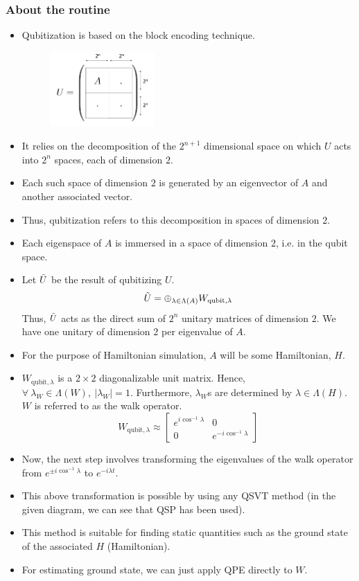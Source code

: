 \documentclass[
10pt, %
a4paper, %
oneside, %
headinclude,footinclude, %
BCOR5mm, %
]{scrartcl}
\begin{document}
\subsubsection{About the routine}
\begin{itemize}
    \item Qubitization is based on the block encoding technique.
    \begin{figure}[H]
        \centering
        \includegraphics[width=40mm]{images/encoding.png}
    \end{figure}
    \item It relies on the decomposition of the $2^{n + 1}$ dimensional space on which $U$ acts into $2^n$ spaces, each of dimension $2$.
    \item Each such space of dimension $2$ is generated by an eigenvector of $A$ and another associated vector.
    \item Thus, qubitization refers to this decomposition in spaces of dimension $2$.
    \item Each eigenspace of $A$ is immersed in a space of dimension $2$, i.e. in the qubit space.
    \item Let $\Tilde{U}$ be the result of qubitizing $U$.
    $$\Tilde{U} = \oplus_{\lambda \in \Lambda(A)} W_{\text{qubit}, \lambda}$$
    Thus, $\Tilde{U}$ acts as the direct sum of ${2^n}$ unitary matrices of dimension $2$. We have one unitary of dimension $2$ per eigenvalue of $A$.
    \item For the purpose of Hamiltonian simulation, $A$ will be some Hamiltonian, $H$.
    \item $W_{\text{qubit}, \lambda}$ is a $2 \times 2$ diagonalizable unit matrix. Hence, $\forall\ {\lambda_W \in \Lambda(W)},\ |\lambda_W| = 1$. Furthermore, $\lambda_W$s are determined by $\lambda \in \Lambda(H)$. $W$ is referred to as the walk operator.
    $$W_{\text{qubit}, \lambda} \approx \begin{bmatrix}e^{i\cos^{-1}\lambda} & 0\\ 0 & e^{-i\cos^{-1}\lambda}\end{bmatrix}$$
    \item Now, the next step involves transforming the eigenvalues of the walk operator from $e^{\pm i\cos^{−1}\lambda}$ to $e^{−i\lambda t}$.
    \item This above transformation is possible by using any QSVT method (in the given diagram, we can see that QSP has been used).
    \item This method is suitable for finding static quantities such as the ground state of the associated $H$ (Hamiltonian). 
    \item For estimating ground state, we can just apply QPE directly to $W$.
\end{itemize}
\end{document}
